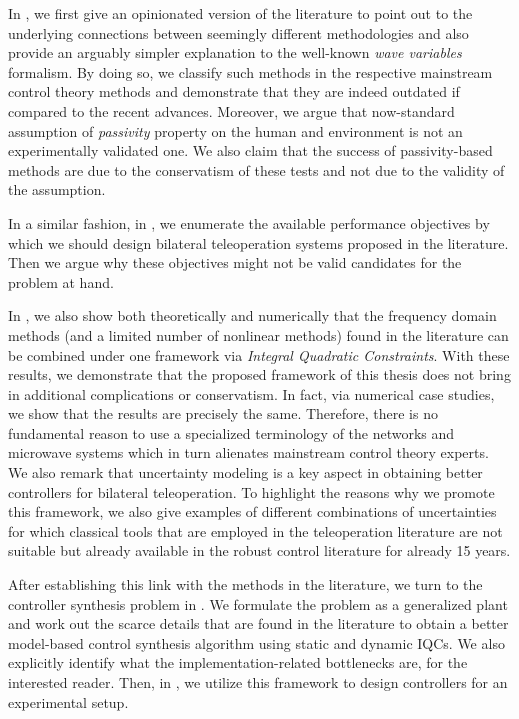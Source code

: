 In , we first give an opinionated version of the literature to point out to the underlying connections between seemingly different methodologies and also provide an arguably simpler explanation to the well-known \emph{wave variables} formalism. By doing so, we classify such methods in the respective mainstream control theory methods and demonstrate that they are indeed outdated if compared to the recent advances. Moreover, we argue that now-standard assumption of \emph{passivity} property on the human and environment is not an experimentally validated one. We also claim that the success of passivity-based methods are due to the conservatism of these tests and not due to the validity of the assumption.

In a similar fashion, in , we enumerate the available performance objectives by which we should design bilateral teleoperation systems proposed in the literature. Then we argue why these objectives might not be valid candidates for the problem at hand.

In , we also show both theoretically and numerically that the frequency domain methods (and a limited number of nonlinear methods) found in the literature can be combined under one framework via \emph{Integral Quadratic Constraints}. With these results, we demonstrate that the proposed framework of this thesis does not bring in additional complications or conservatism. In fact, via numerical case studies, we show that the results are precisely the same. Therefore, there is no fundamental reason to use a specialized terminology of the networks and microwave systems which in turn alienates mainstream control theory experts. We also remark that uncertainty modeling is a key aspect in obtaining better controllers for bilateral teleoperation. To highlight the reasons why we promote this framework, we also give examples of different combinations of uncertainties for which classical tools that are employed in the teleoperation literature are not suitable but already available in the robust control literature for already 15 years. 


After establishing this link with the methods in the literature, we turn to the controller synthesis problem in . We formulate the problem as a generalized plant and work out the scarce details that are found in the literature to obtain a better model-based control synthesis algorithm using static and dynamic IQCs. We also explicitly identify what the implementation-related bottlenecks are, for the interested reader.  Then, in , we utilize this framework to design controllers for an experimental setup.

